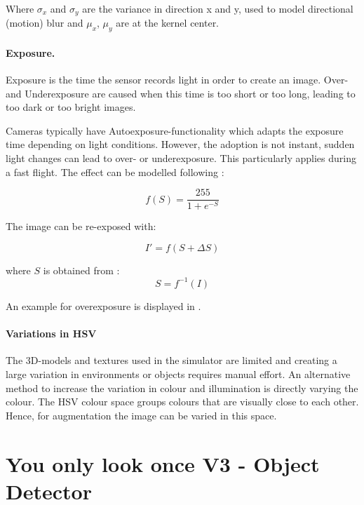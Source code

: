 Where $\sigma_x$ and $\sigma_y$ are the variance in direction x and y, used to model directional (motion) blur and $\mu_x$, $\mu_y$ are at the kernel center. 

\paragraph{Exposure.}

Exposure is the time the sensor records light in order to create an image. Over- and Underexposure are caused when this time is too short or too long, leading to too dark or too bright images.

Cameras typically have Autoexposure-functionality which adapts the exposure time depending on light conditions. However, the adoption is not instant, sudden light changes can lead to over- or underexposure. This particularly applies during a fast flight. The effect can be modelled following \cite{Carlson2018}:

\begin{equation}
f(S) = \frac{255}{1 + e^{-S}}
\end{equation}

The image can be re-exposed with:

\begin{equation}
I' = f(S+\Delta S)
\end{equation}

where $S$ is obtained from :
\begin{equation}
S = f^{-1}(I)
\end{equation}

An example for overexposure is displayed in . 

\paragraph{Variations in \ac{HSV}}

The 3D-models and textures used in the simulator are limited and creating a large variation in environments or objects requires manual effort. An alternative method to increase the variation in colour and illumination is directly varying the colour. The \ac{HSV} colour space groups colours that are visually close to each other. Hence, for augmentation the image can be varied in this space. 
 

\section{You only look once V3 - Object Detector}

